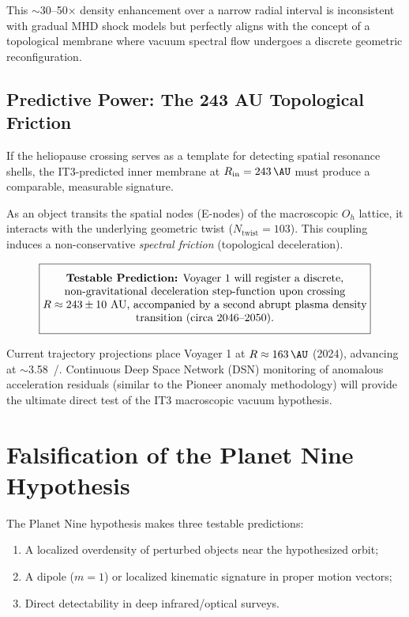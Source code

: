 \documentclass[11pt,a4paper]{article}
\theoremstyle{remark}
\newcommand{\Oh}{O_h}
\begin{document}
This $\sim$30--50$\times$ density enhancement over a narrow radial interval is inconsistent with gradual MHD shock models but perfectly aligns with the concept of a topological membrane where vacuum spectral flow undergoes a discrete geometric reconfiguration.

\subsection{Predictive Power: The 243 AU Topological Friction}

If the heliopause crossing serves as a template for detecting spatial resonance shells, the IT3-predicted inner membrane at $R_{\text{in}} = \SI{243}{\AU}$ must produce a comparable, measurable signature. 

As an object transits the spatial nodes (E-nodes) of the macroscopic $\Oh$ lattice, it interacts with the underlying geometric twist ($N_{\text{twist}}=103$). This coupling induces a non-conservative \textit{spectral friction} (topological deceleration).

\begin{equation}
\label{eq:voyager_pred}
\boxed{
\begin{minipage}{0.85\textwidth}
\centering\vspace{2mm}
\textbf{Testable Prediction:} Voyager 1 will register a discrete, non-gravitational deceleration step-function upon crossing $R \approx 243 \pm 10 \text{ AU}$, accompanied by a second abrupt plasma density transition (circa 2046--2050).\vspace{2mm}
\end{minipage}
}
\end{equation}

Current trajectory projections place Voyager 1 at $R \approx \SI{163}{\AU}$ (2024), advancing at $\sim$\SI{3.58}{\AU/\yr}. Continuous Deep Space Network (DSN) monitoring of anomalous acceleration residuals (similar to the Pioneer anomaly methodology) will provide the ultimate direct test of the IT3 macroscopic vacuum hypothesis.

\section{Falsification of the Planet Nine Hypothesis}
\label{sec:falsification}

The Planet Nine hypothesis makes three testable predictions:
\begin{enumerate}
\item A localized overdensity of perturbed objects near the hypothesized orbit;
\item A dipole ($m=1$) or localized kinematic signature in proper motion vectors;
\item Direct detectability in deep infrared/optical surveys.
\end{enumerate}
\end{document}
